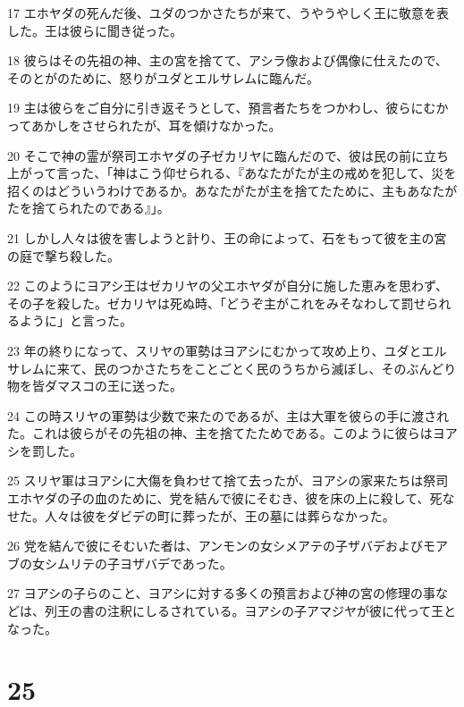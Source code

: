 \par 17 エホヤダの死んだ後、ユダのつかさたちが来て、うやうやしく王に敬意を表した。王は彼らに聞き従った。
\par 18 彼らはその先祖の神、主の宮を捨てて、アシラ像および偶像に仕えたので、そのとがのために、怒りがユダとエルサレムに臨んだ。
\par 19 主は彼らをご自分に引き返そうとして、預言者たちをつかわし、彼らにむかってあかしをさせられたが、耳を傾けなかった。
\par 20 そこで神の霊が祭司エホヤダの子ゼカリヤに臨んだので、彼は民の前に立ち上がって言った、「神はこう仰せられる、『あなたがたが主の戒めを犯して、災を招くのはどういうわけであるか。あなたがたが主を捨てたために、主もあなたがたを捨てられたのである』」。
\par 21 しかし人々は彼を害しようと計り、王の命によって、石をもって彼を主の宮の庭で撃ち殺した。
\par 22 このようにヨアシ王はゼカリヤの父エホヤダが自分に施した恵みを思わず、その子を殺した。ゼカリヤは死ぬ時、「どうぞ主がこれをみそなわして罰せられるように」と言った。
\par 23 年の終りになって、スリヤの軍勢はヨアシにむかって攻め上り、ユダとエルサレムに来て、民のつかさたちをことごとく民のうちから滅ぼし、そのぶんどり物を皆ダマスコの王に送った。
\par 24 この時スリヤの軍勢は少数で来たのであるが、主は大軍を彼らの手に渡された。これは彼らがその先祖の神、主を捨てたためである。このように彼らはヨアシを罰した。
\par 25 スリヤ軍はヨアシに大傷を負わせて捨て去ったが、ヨアシの家来たちは祭司エホヤダの子の血のために、党を結んで彼にそむき、彼を床の上に殺して、死なせた。人々は彼をダビデの町に葬ったが、王の墓には葬らなかった。
\par 26 党を結んで彼にそむいた者は、アンモンの女シメアテの子ザバデおよびモアブの女シムリテの子ヨザバデであった。
\par 27 ヨアシの子らのこと、ヨアシに対する多くの預言および神の宮の修理の事などは、列王の書の注釈にしるされている。ヨアシの子アマジヤが彼に代って王となった。

\chapter{25}


